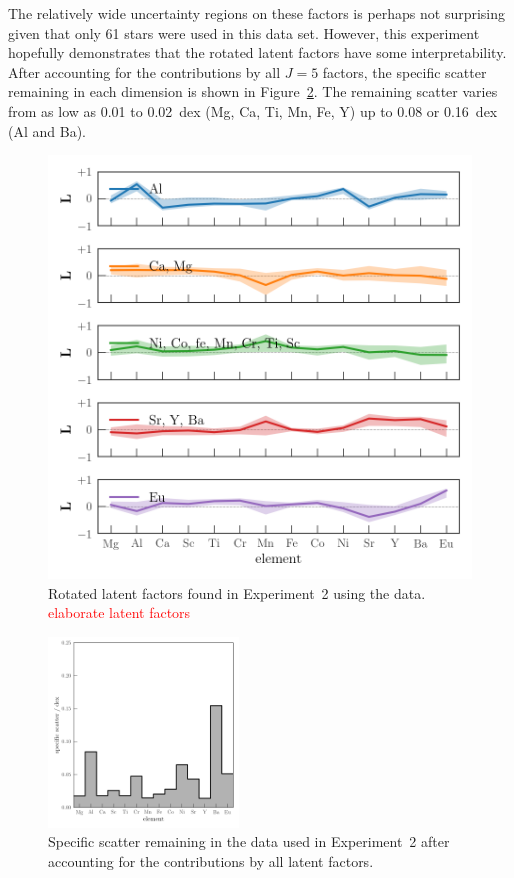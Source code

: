 \documentclass[twocolumn]{aastex62}
\newcommand{\todo}[1]{\textcolor{red}{#1}}
\begin{document}
The relatively wide uncertainty regions on these factors is perhaps not
surprising given that only 61 stars were used in this data set. However, this
experiment hopefully demonstrates that the rotated latent factors have some
interpretability. After accounting for the contributions by all
$J = 5$ factors, the specific scatter remaining in each dimension is shown in
Figure~\ref{fig:exp2-specific-scatter}. The remaining scatter varies from as low 
as 0.01 to 0.02~dex (Mg, Ca, Ti, Mn, Fe, Y) up to 0.08 or 0.16~dex (Al and Ba). 



\begin{figure}
	\includegraphics[width=\textwidth]{experiments/exp2-latent-factors.png}
	\caption{Rotated latent factors found in Experiment~2 using the \citet{Barklem:2005}
			 data. \todo{elaborate latent factors}}
    \label{fig:exp2-latent-factors}
\end{figure}



\begin{figure}
	\includegraphics[width=0.45\textwidth]{experiments/exp2-specific-scatter.png}
	\caption{Specific scatter remaining in the \citet{Barklem:2005} data used in
			 Experiment~2 after accounting for the contributions by all latent
			 factors.}
    \label{fig:exp2-specific-scatter}
\end{figure}
\end{document}
